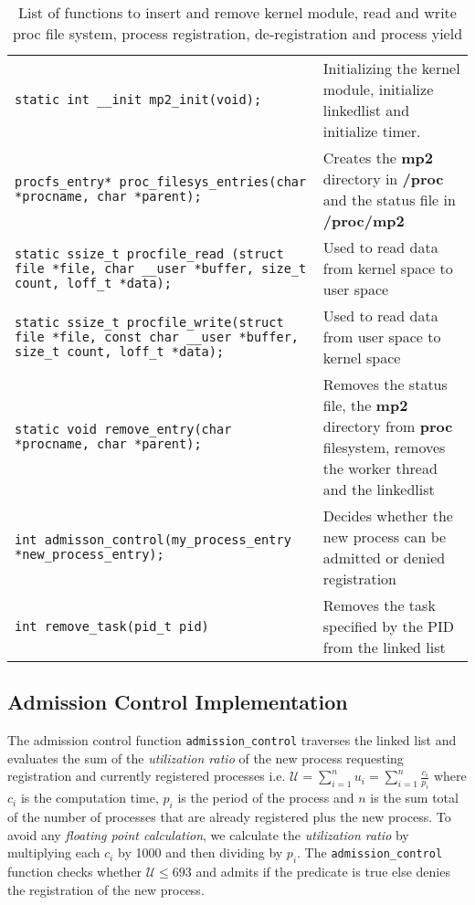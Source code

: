 \begin{table*}[h]
  \centering
  \rcow
  \caption{List of functions to insert and remove kernel module, read and write proc file system, process registration,
de-registration and process yield\label{table:Proc}}
  \begin{tabular}{|p{7.5cm}|p{8cm}|}
    {\tt static int \_\_init mp2\_init(void);}  &  Initializing the kernel module, initialize linkedlist and initialize timer.  \\
    {\tt procfs\_entry* proc\_filesys\_entries(char *procname, char *parent);}     &  Creates the {\bf mp2} directory in {\bf /proc} and the status
file in {\bf /proc/mp2}  \\
    {\tt static ssize\_t procfile\_read (struct file *file, char \_\_user *buffer, size\_t count, loff\_t *data);}&  Used to read data from kernel
space to user space\\
    {\tt static ssize\_t procfile\_write(struct file *file, const char \_\_user *buffer, size\_t count, loff\_t *data);}&  Used to read data from user
space to kernel space\\
    {\tt static void remove\_entry(char *procname, char *parent);}  & Removes the status file, the {\bf mp2} directory from {\bf proc} filesystem, removes the worker thread and the linkedlist \\
    {\tt int admisson\_control(my\_process\_entry *new\_process\_entry);} &  Decides whether the new process can be admitted or denied registration \\
    {\tt int remove\_task(pid\_t pid)} & Removes the task specified by the PID from the linked list
  \end{tabular}
\end{table*}

\subsection{Admission Control Implementation}\label{subsec:admission}

The admission control function {\tt admission\_control} traverses the linked list and evaluates the sum of the {\em utilization ratio} of the new process requesting registration and currently registered processes i.e. $\mathcal{U} = \displaystyle\sum_{i = 1}^{n}u_i =  \displaystyle\sum_{i = 1}^{n}\frac{c_i}{p_i}$ where $c_i$ is the computation time, $p_i$ is the period of the process and $n$ is the sum total of the number of processes that are already registered plus the new process. To avoid any {\em floating point calculation}, we calculate the {\em utilization ratio} by multiplying each $c_i$ by 1000 and then dividing by $p_i$. The {\tt admission\_control} function checks whether $\mathcal{U} \leq 693$ and admits if the predicate is true else denies the registration of the new process.